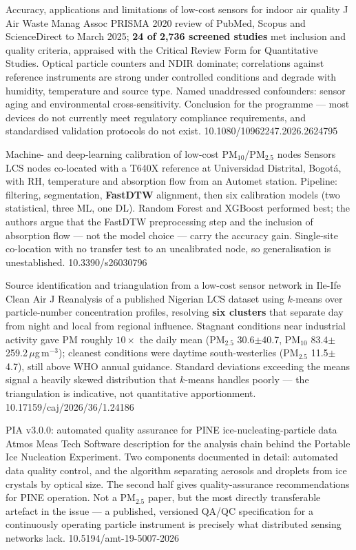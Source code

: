 \documentclass[10pt]{article}
\begin{document}
{Accuracy, applications and limitations of low-cost sensors for indoor air quality}
{J Air Waste Manag Assoc}
{PRISMA 2020 review of PubMed, Scopus and ScienceDirect to March 2025;
\textbf{24 of 2{,}736 screened studies} met inclusion and quality criteria, appraised with
the Critical Review Form for Quantitative Studies. Optical particle counters and NDIR
dominate; correlations against reference instruments are strong under controlled
conditions and degrade with humidity, temperature and source type. Named unaddressed
confounders: sensor aging and environmental cross-sensitivity. Conclusion for the
programme --- most devices do not currently meet regulatory compliance requirements, and
standardised validation protocols do not exist.}
{10.1080/10962247.2026.2624795}

{Machine- and deep-learning calibration of low-cost PM$_{10}$/PM$_{2.5}$ nodes}
{Sensors}
{LCS nodes co-located with a T640X reference at Universidad Distrital, Bogot\'a, with RH,
temperature and absorption flow from an Automet station. Pipeline: filtering,
segmentation, \textbf{FastDTW} alignment, then six calibration models (two statistical,
three ML, one DL). Random Forest and XGBoost performed best; the authors argue that the
FastDTW preprocessing step and the inclusion of absorption flow --- not the model
choice --- carry the accuracy gain. Single-site co-location with no transfer test to an
uncalibrated node, so generalisation is unestablished.}
{10.3390/s26030796}

{Source identification and triangulation from a low-cost sensor network in Ile-Ife}
{Clean Air J}
{Reanalysis of a published Nigerian LCS dataset using $k$-means over particle-number
concentration profiles, resolving \textbf{six clusters} that separate day from night and
local from regional influence. Stagnant conditions near industrial activity gave PM
roughly $10\times$ the daily mean (PM$_{2.5}$ 30.6$\pm$40.7, PM$_{10}$
83.4$\pm$259.2\,$\mu$g\,m$^{-3}$); cleanest conditions were daytime south-westerlies
(PM$_{2.5}$ 11.5$\pm$4.7), still above WHO annual guidance. Standard deviations exceeding
the means signal a heavily skewed distribution that $k$-means handles poorly --- the
triangulation is indicative, not quantitative apportionment.}
{10.17159/caj/2026/36/1.24186}

{PIA v3.0.0: automated quality assurance for PINE ice-nucleating-particle data}
{Atmos Meas Tech}
{Software description for the analysis chain behind the Portable Ice Nucleation
Experiment. Two components documented in detail: automated data quality control, and the
algorithm separating aerosols and droplets from ice crystals by optical size. The second
half gives quality-assurance recommendations for PINE operation. Not a PM$_{2.5}$ paper,
but the most directly transferable artefact in the issue --- a published, versioned QA/QC
specification for a continuously operating particle instrument is precisely what
distributed sensing networks lack.}
{10.5194/amt-19-5007-2026}
\end{document}

